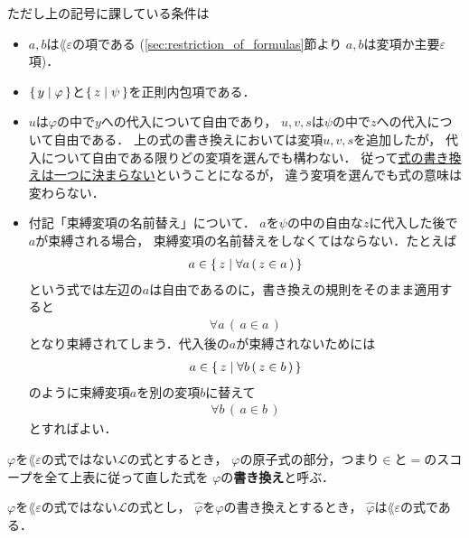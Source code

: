 	ただし上の記号に課している条件は
	\begin{itemize}
		\item $a,b$は$\lang{\varepsilon}$の項である
			(\ref{sec:restriction_of_formulas}節より
			$a,b$は変項か主要$\varepsilon$項)．
		
		\item $\{\, y \mid \varphi\, \}$と$\{\, z \mid \psi\, \}$を正則内包項である．
		
		\item $u$は$\varphi$の中で$y$への代入について自由であり，
			$u,v,s$は$\psi$の中で$z$への代入について自由である．
			上の式の書き換えにおいては変項$u,v,s$を追加したが，
			代入について自由である限りどの変項を選んでも構わない．
			従って\underline{式の書き換えは一つに決まらない}ということになるが，
			違う変項を選んでも式の意味は変わらない．
			
		\item 付記「束縛変項の名前替え」について．
			$a$を$\psi$の中の自由な$z$に代入した後で$a$が束縛される場合，
			束縛変項の名前替えをしなくてはならない．たとえば
			\begin{align}
				a \in \{\, z \mid \forall a\, (\, z \in a\, )\, \}
			\end{align}
			という式では左辺の$a$は自由であるのに，書き換えの規則をそのまま適用すると
			\begin{align}
				\forall a\, (\, a \in a\, )
			\end{align}
			となり束縛されてしまう．代入後の$a$が束縛されないためには
			\begin{align}
				a \in \{\, z \mid \forall b\, (\, z \in b\, )\, \}
			\end{align}
			のように束縛変項$a$を別の変項$b$に替えて
			\begin{align}
				\forall b\, (\, a \in b\, )
			\end{align}
			とすればよい．
	\end{itemize}
	
	\begin{screen}
		\begin{metadfn}[式の書き換え]
			$\varphi$を$\lang{\varepsilon}$の式ではない$\mathcal{L}$の式とするとき，
			$\varphi$の原子式の部分，つまり$\in$と$=$のスコープを全て上表に従って直した式を
			$\varphi$の{\bf 書き換え}と呼ぶ．
		\end{metadfn}
	\end{screen}
	
	\begin{screen}
		\begin{metathm}
		\label{metathm:rewritten_formulas_are_of_L_epsilon}
			$\varphi$を$\lang{\varepsilon}$の式ではない$\mathcal{L}$の式とし，
			$\widehat{\varphi}$を$\varphi$の書き換えとするとき，
			$\widehat{\varphi}$は$\lang{\varepsilon}$の式である．
		\end{metathm}
	\end{screen}
	
